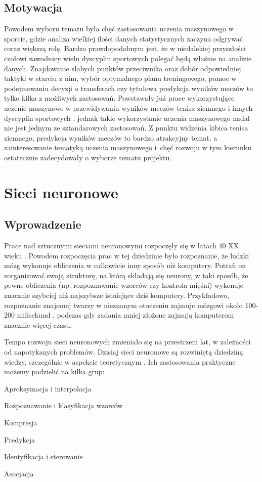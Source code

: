 \section{Motywacja}
\label{Sec:Motiv}
Powodem wyboru tematu była chęć zastosowania uczenia maszynowego w sporcie, gdzie analiza wielkiej ilości danych statystycznych zaczyna odgrywać coraz większą rolę. Bardzo prawdopodobnym jest, że w niedalekiej przyszłości czołowi zawodnicy wielu dyscyplin sportowych polegać będą właśnie na analizie danych. Znajdowanie słabych punktów przeciwnika oraz dobór odpowiedniej taktyki w starciu z nim, wybór optymalnego planu treningowego, pomoc w podejmowaniu decyzji o transferach czy tytułowa predykcja wyników meczów to tylko kilka z możliwych zastosowań. Powstawały już prace wykorzystujące uczenie maszynowe w przewidywaniu wyników meczów tenisa ziemnego \cite{mlten01} i innych dyscyplin sportowych \cite{mlten02}, jednak takie wykorzystanie uczenia maszynowego nadal nie jest jednym ze sztandarowych zastosowań. Z punktu widzenia kibica tenisa ziemnego, predykcja wyników meczów to bardzo atrakcyjny temat, a zainteresowanie tematyką uczenia maszynowego i~chęć rozwoju w tym kierunku ostatecznie zadecydowały o wyborze tematu projektu.


\chapter{Sieci neuronowe}
\section{Wprowadzenie}
\label{Sec:ThIntro}
Prace nad sztucznymi sieciami neuronowymi rozpoczęły się w latach 40 XX wieku \cite{osow01}. Powodem rozpoczęcia prac w tej dziedzinie było rozpoznanie, że ludzki mózg wykonuje obliczenia w całkowicie inny sposób niż komputery. Potrafi on zorganizować swoją strukturę, na którą składają się neurony, w taki sposób, że pewne obliczenia (np. rozpoznawanie wzorców czy kontrola mięśni) wykonuje znacznie szybciej niż najszybsze istniejące dziś komputery. Przykładowo, rozpoznanie znajomej twarzy w nieznanym otoczeniu zajmuje mózgowi około 100-200 milisekund \cite{hayk01}, podczas gdy zadania mniej złożone zajmują komputerom znacznie więcej czasu. 

Tempo rozwoju sieci neuronowych zmieniało się na przestrzeni lat, w zależności od napotykanych problemów. Dzisiaj sieci neuronowe są rozwiniętą dziedziną wiedzy, szczególnie w aspekcie teoretycznym \cite{osow01}. Ich zastosowania praktyczne możemy podzielić na kilka grup:
\begin{tightitemize}
\item Aproksymacja i interpolacja
\item Rozpoznawanie i klasyfikacja wzorców
\item Kompresja
\item Predykcja
\item Identyfikacja i sterowanie
\item Asocjacja
\end{tightitemize}

